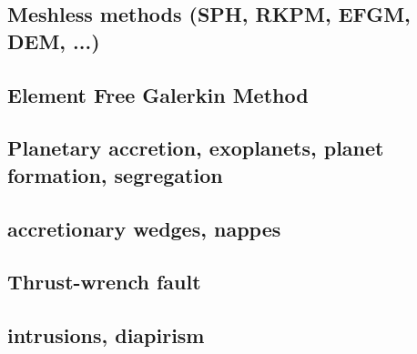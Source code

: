 \cite{trry95}
\cite{zhzl07}
\cite{zhzm09}
\cite{begb19}


\subsection*{Meshless methods (SPH, RKPM, EFGM, DEM, ...)}

\cite{beko96}
\cite{pobe98}
\cite{febh05}
\cite{prcl11}\cite{kukg11}
\cite{koau13}
\cite{nifs15}
\cite{krrk18}

\subsection*{Element Free Galerkin Method}

\cite{belg95a}
\cite{belg95b}
\cite{bekf96}
\cite{bekk97}




\subsection*{Planetary accretion, exoplanets, planet formation, segregation}

\cite{lejm08}
\cite{ligt09}\cite{gogk09}
\cite{ligt11}
\cite{gobg14}\cite{yadl14}
\cite{neum19}

\subsection*{accretionary wedges, nappes} 

\cite{koon94}
\cite{wiep03}
\cite{rugb14}
\cite{mauw16}
\cite{mauw17}\cite{rugb17}
\cite{elgb19}

\subsection*{Thrust-wrench fault} 

\cite{rods15}

\subsection*{intrusions, diapirism}

